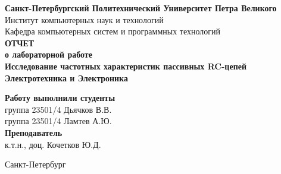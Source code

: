 \begin{titlepage}	%

	\begin{center}		%

		 \textbf{Санкт-Петербургский Политехнический Университет Петра Великого}\\[0.3cm]
		 \small Институт компьютерных наук и технологий \\[0.3cm]
		 \small Кафедра компьютерных систем и программных технологий\\[4cm]
		
		 \textbf{ОТЧЕТ}\\ \textbf{о лабораторной работе}\\[0.5cm]
		 \textbf{Исследование частотных характеристик пассивных RC-цепей}\\[0.1cm]
		 \textbf{Электротехника и Электроника}\\[10.5cm]

	\end{center}


	\begin{flushright} %
		\begin{minipage}{0.60\textwidth} %
			\begin{flushleft} %

				 \small \textbf{Работу выполнили студенты}\\[3mm]
				 \small группа 23501/4\hspace*{17mm}   Дьячков В.В.\\[3mm]
				 \small группа 23501/4\hspace*{17mm}   Ламтев А.Ю.\\[5mm]
				
				\small \textbf{Преподаватель}\\[5mm]
			 	\small \sign[3.5cm]   \hspace*{8mm} к.т.н., доц. Кочетков Ю.Д.\\[0.5cm]

			\end{flushleft}
		\end{minipage}
	\end{flushright}
	
	\vfill %

	\begin{center}
	\small Санкт-Петербург\\
	\small \the\year %
	\end{center} %

\thispagestyle{empty} %
\end{titlepage} %

\vfill %
